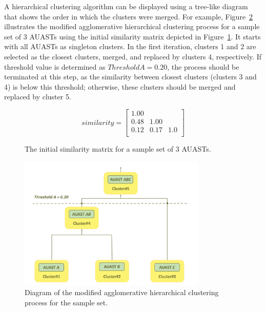 A hierarchical clustering algorithm can be displayed using a tree-like diagram that shows the order in which the clusters were merged. For example, Figure~\ref{fig:overview2} illustrates the modified agglomerative hierarchical clustering process for a sample set of 3 AUASTs using the initial similarity matrix depicted in Figure~\ref{matrix}. It starts with all AUASTs as singleton clusters. In the first iteration, clusters 1 and 2 are selected as the closest clusters, merged, and replaced by clusters 4, respectively. If threshold value is determined as $Threshold A = 0.20$, the process should be terminated at this step, as the similarity between closest clusters (clusters 3 and 4) is below this threshold; otherwise, these clusters should be merged and replaced by cluster 5. 





\begin{figure}[h]
  \centering
    \centering
   \begin{displaymath}
    similarity = \left[
        \begin{matrix}
        1.00 &  &     \\
0.48 & 1.00 &    \\
0.12 & 0.17 & 1.0   \\
        \end{matrix}   \right]
\end{displaymath}
 \caption{The initial similarity matrix for a sample set of 3 AUASTs.}
  \label{matrix}
  \end{figure}
  
  \begin{figure} [h]
 
   \centering\includegraphics [width = 0.8\textwidth]{Drawing4/clustering.pdf}
  \caption{Diagram of the modified agglomerative hierarchical clustering process for the sample set.}
  \label{fig:overview2}
\end{figure}
 

